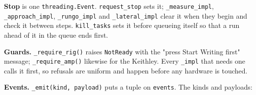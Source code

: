 \textbf{Stop} is one \texttt{threading.\discretionary{}{}{}Event}. \texttt{request\_\discretionary{}{}{}stop} sets it; \texttt{\_\discretionary{}{}{}measure\_\discretionary{}{}{}impl}, \texttt{\_\discretionary{}{}{}approach\_\discretionary{}{}{}impl}, \texttt{\_\discretionary{}{}{}rungo\_\discretionary{}{}{}impl} and \texttt{\_\discretionary{}{}{}lateral\_\discretionary{}{}{}impl} clear it when they begin and check it between steps. \texttt{kill\_\discretionary{}{}{}tasks} sets it before queueing itself so that a run ahead of it in the queue ends first.

\textbf{Guards.} \texttt{\_\discretionary{}{}{}require\_\discretionary{}{}{}rig()} raises \texttt{Not\discretionary{}{}{}Ready} with the "press Start Writing first" message; \texttt{\_\discretionary{}{}{}require\_\discretionary{}{}{}amp()} likewise for the Keithley. Every \texttt{\_\discretionary{}{}{}impl} that needs one calls it first, so refusals are uniform and happen before any hardware is touched.

\textbf{Events.} \texttt{\_\discretionary{}{}{}emit(kind,\discretionary{}{}{} payload)} puts a tuple on \texttt{events}. The kinds and payloads:

